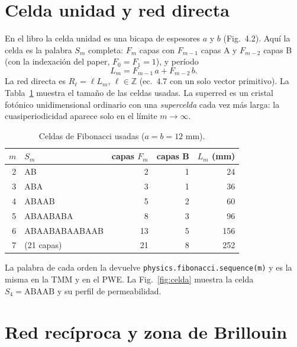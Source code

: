 \documentclass[11pt,a4paper]{article}
\newcommand{\code}[1]{\texttt{#1}}
\begin{document}
\section{Celda unidad y red directa}\label{sec:celda}

En el libro la celda unidad es una bicapa de espesores $a$ y $b$ (Fig.~4.2).
Aquí la celda es la palabra $S_m$ completa: $F_m$ capas con $F_{m-1}$ capas A y
$F_{m-2}$ capas B (con la indexación del paper, $F_0=F_1=1$), y período
\begin{equation}
L_m=F_{m-1}\,a+F_{m-2}\,b .
\end{equation}
La red directa es $R_\ell=\ell L_m$, $\ell\in\mathbb Z$ (ec.~4.7 con un solo
vector primitivo). La Tabla~\ref{tab:celdas} muestra el tamaño de las celdas
usadas. La superred es un cristal fotónico unidimensional ordinario con una
\emph{supercelda} cada vez más larga: la cuasiperiodicidad aparece solo en el
límite $m\to\infty$.

\begin{table}[H]
\centering
\caption{Celdas de Fibonacci usadas ($a=b=12$ mm).}
\label{tab:celdas}
\begin{tabular}{rlrrr}
\toprule
$m$ & $S_m$ & capas $F_m$ & capas B & $L_m$ (mm) \\
\midrule
2 & AB & 2 & 1 & 24 \\
3 & ABA & 3 & 1 & 36 \\
4 & ABAAB & 5 & 2 & 60 \\
5 & ABAABABA & 8 & 3 & 96 \\
6 & ABAABABAABAAB & 13 & 5 & 156 \\
7 & (21 capas) & 21 & 8 & 252 \\
\bottomrule
\end{tabular}
\end{table}

\noindent La palabra de cada orden la devuelve \code{physics.fibonacci.sequence(m)}
y es la misma en la TMM y en el PWE. La Fig.~\ref{fig:celda} muestra la celda
$S_4=\mathrm{ABAAB}$ y su perfil de permeabilidad.

\section{Red recíproca y zona de Brillouin}\label{sec:reciproca}
\end{document}

